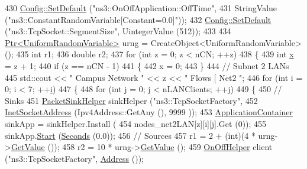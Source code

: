 \begin{DoxyCode}
430   \hyperlink{group__config_ga2e7882df849d8ba4aaad31c934c40c06}{Config::SetDefault} (\textcolor{stringliteral}{"ns3::OnOffApplication::OffTime"},
431                       StringValue (\textcolor{stringliteral}{"ns3::ConstantRandomVariable[Constant=0.0]"}));
432   \hyperlink{group__config_ga2e7882df849d8ba4aaad31c934c40c06}{Config::SetDefault} (\textcolor{stringliteral}{"ns3::TcpSocket::SegmentSize"}, UintegerValue (512));
433 
434   \hyperlink{classns3_1_1Ptr}{Ptr<UniformRandomVariable>} urng = CreateObject<UniformRandomVariable> ();
435   \textcolor{keywordtype}{int} r1;
436   \textcolor{keywordtype}{double} r2;
437   \textcolor{keywordflow}{for} (\textcolor{keywordtype}{int} z = 0; z < nCN; ++z) 
438     \{
439       \textcolor{keywordtype}{int} \hyperlink{lte__link__budget__x2__handover__measures_8m_a9336ebf25087d91c818ee6e9ec29f8c1}{x} = z + 1;
440       \textcolor{keywordflow}{if} (z == nCN - 1) 
441         \{
442           x = 0;
443         \}
444       \textcolor{comment}{// Subnet 2 LANs}
445       std::cout << \textcolor{stringliteral}{"  Campus Network "} << z << \textcolor{stringliteral}{" Flows [ Net2 "};
446       \textcolor{keywordflow}{for} (\textcolor{keywordtype}{int} i = 0; i < 7; ++\hyperlink{bernuolliDistribution_8m_a6f6ccfcf58b31cb6412107d9d5281426}{i}) 
447         \{
448           \textcolor{keywordflow}{for} (\textcolor{keywordtype}{int} j = 0; j < nLANClients; ++j) 
449             \{
450               \textcolor{comment}{// Sinks}
451               \hyperlink{classns3_1_1PacketSinkHelper}{PacketSinkHelper} sinkHelper (\textcolor{stringliteral}{"ns3::TcpSocketFactory"},
452                                            \hyperlink{classns3_1_1InetSocketAddress}{InetSocketAddress} (Ipv4Address::GetAny (), 9999
      ));
453               \hyperlink{classns3_1_1ApplicationContainer}{ApplicationContainer} sinkApp = sinkHelper.Install (
454                   nodes\_net2LAN[z][i][j].Get (0));
455               sinkApp.\hyperlink{classns3_1_1ApplicationContainer_a8eff87926507020bbe3e1390358a54a7}{Start} (\hyperlink{group__timecivil_ga33c34b816f8ff6628e33d5c8e9713b9e}{Seconds} (0.0));
456               \textcolor{comment}{// Sources}
457               r1 = 2 + (int)(4 * urng->\hyperlink{classns3_1_1UniformRandomVariable_a03822d8c86ac51e9aa83bbc73041386b}{GetValue} ());
458               r2 = 10 * urng->\hyperlink{classns3_1_1UniformRandomVariable_a03822d8c86ac51e9aa83bbc73041386b}{GetValue} ();
459               \hyperlink{classns3_1_1OnOffHelper}{OnOffHelper} client (\textcolor{stringliteral}{"ns3::TcpSocketFactory"}, \hyperlink{classns3_1_1Address}{Address} ());

\end{DoxyCode}

